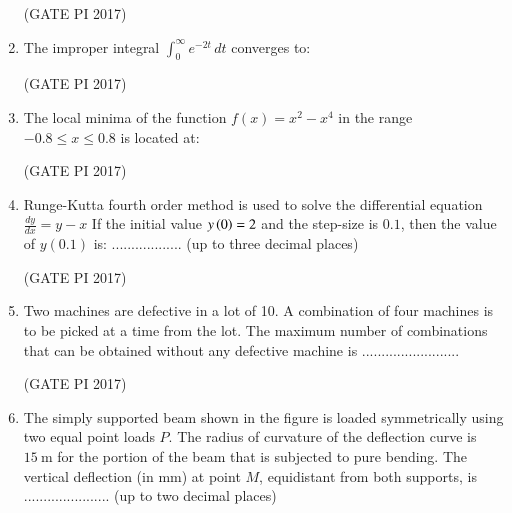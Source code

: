 \documentclass[journal,12pt,onecolumn]{IEEEtran}
\theoremstyle{remark}
\begin{document}
\begin{enumerate}
\hfill (GATE PI 2017)

\item The improper integral $\int_{0}^{\infty} e^{-2t} \, dt$ converges to:
\begin{enumerate}
\end{enumerate}
\hfill (GATE PI 2017)

\item The local minima of the function $f(x) = x^{2} - x^{4}$ in the range $-0.8 \leq x \leq 0.8$ is located at:
\begin{enumerate}
\end{enumerate}
\hfill (GATE PI 2017)

\item Runge\--Kutta fourth order method is used to solve the differential equation
$
\frac{dy}{dx} = y - x
$
If the initial value $y\left(0\right) = 2$ and the step-size is $0.1$, then the value of $y(0.1)$ is:  
.................. (up to three decimal places)  

\hfill (GATE PI 2017)

\item Two machines are defective in a lot of 10. A combination of four machines is to be picked at a time from the lot.  
The maximum number of combinations that can be obtained without any defective machine is .........................
  
\hfill (GATE PI 2017)

\item The simply supported beam shown in the figure is loaded symmetrically using two equal point loads $P$.  
The radius of curvature of the deflection curve is $15 \ \text{m}$ for the portion of the beam that is subjected to pure bending.  
The vertical deflection (in mm) at point $M$, equidistant from both supports, is ...................... (up to two decimal places)


\end{enumerate}
\end{document}
